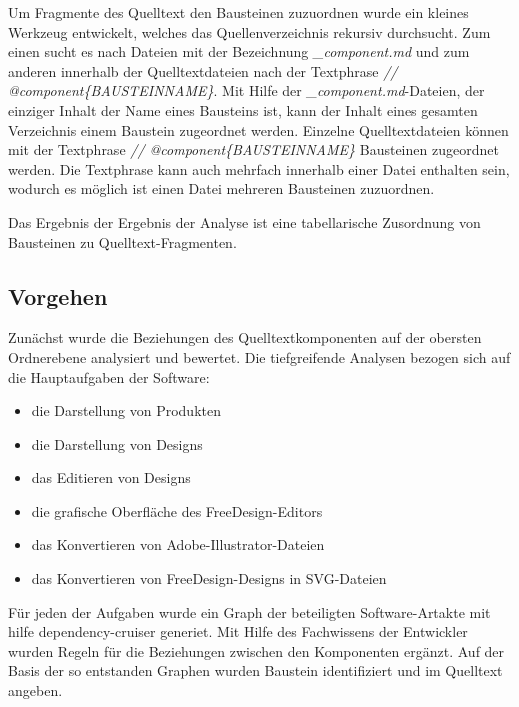 Um Fragmente des Quelltext den Bausteinen zuzuordnen wurde ein kleines Werkzeug entwickelt, welches das Quellenverzeichnis rekursiv durchsucht. Zum einen sucht es nach Dateien mit der Bezeichnung \glqq\emph{\_component.md}\grqq{} und zum anderen innerhalb der Quelltextdateien nach der Textphrase \glqq\emph{// @component\{BAUSTEINNAME\}}\grqq. 
Mit Hilfe der \glqq\emph{\_component.md}\grqq-Dateien, der einziger Inhalt der Name eines Bausteins ist, kann der Inhalt eines gesamten Verzeichnis einem Baustein zugeordnet werden. Einzelne Quelltextdateien können mit der Textphrase \glqq\emph{// @component\{BAUSTEINNAME\}}\grqq{} Bausteinen zugeordnet werden. Die Textphrase kann auch mehrfach innerhalb einer Datei enthalten sein, wodurch es möglich ist einen Datei mehreren Bausteinen zuzuordnen. 

Das Ergebnis der Ergebnis der Analyse ist eine tabellarische Zusordnung von Bausteinen zu Quelltext-Fragmenten.

\subsection{Vorgehen}
Zunächst wurde die Beziehungen des Quelltextkomponenten auf der obersten Ordnerebene analysiert und bewertet.
Die tiefgreifende Analysen bezogen sich auf die Hauptaufgaben der Software:
\begin{itemize}
    \item die Darstellung von Produkten
    \item die Darstellung von Designs
    \item das Editieren von Designs
    \item die grafische Oberfläche des FreeDesign-Editors
    \item das Konvertieren von Adobe-Illustrator-Dateien
    \item das Konvertieren von FreeDesign-Designs in SVG-Dateien
\end{itemize}
Für jeden der Aufgaben wurde ein Graph der beteiligten Software-Artakte mit hilfe {dependency-cruiser} generiet. 
Mit Hilfe des Fachwissens der Entwickler wurden Regeln für die Beziehungen zwischen den Komponenten ergänzt. 
Auf der Basis der so entstanden Graphen wurden Baustein identifiziert und im Quelltext angeben.



